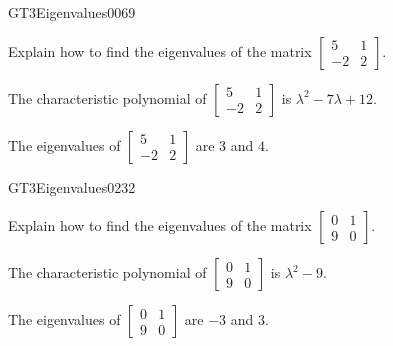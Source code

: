 \newpage




\begin{exercise}{GT3}{Eigenvalues}{0069} 
\begin{exerciseStatement} 

Explain how to find the eigenvalues of the matrix \(\left[\begin{array}{cc}
5 & 1 \\
-2 & 2
\end{array}\right]\).

 \end{exerciseStatement}
 \begin{exerciseAnswer} 

The characteristic polynomial of \(\left[\begin{array}{cc}
5 & 1 \\
-2 & 2
\end{array}\right]\) is \(\lambda^{2} - 7 \lambda + 12\).

 

The eigenvalues of \(\left[\begin{array}{cc}
5 & 1 \\
-2 & 2
\end{array}\right]\) are \(3\) and \(4\).

 \end{exerciseAnswer}
 \end{exercise}



\begin{exercise}{GT3}{Eigenvalues}{0232} 
\begin{exerciseStatement} 

Explain how to find the eigenvalues of the matrix \(\left[\begin{array}{cc}
0 & 1 \\
9 & 0
\end{array}\right]\).

 \end{exerciseStatement}
 \begin{exerciseAnswer} 

The characteristic polynomial of \(\left[\begin{array}{cc}
0 & 1 \\
9 & 0
\end{array}\right]\) is \(\lambda^{2} - 9\).

 

The eigenvalues of \(\left[\begin{array}{cc}
0 & 1 \\
9 & 0
\end{array}\right]\) are \(-3\) and \(3\).

 \end{exerciseAnswer}
 \end{exercise}


